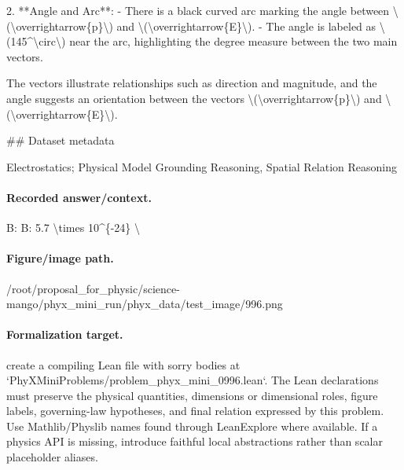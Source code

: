 2. **Angle and Arc**:
   - There is a black curved arc marking the angle between \textbackslash{}(\textbackslash{}overrightarrow\{p\}\textbackslash{}) and \textbackslash{}(\textbackslash{}overrightarrow\{E\}\textbackslash{}).
   - The angle is labeled as \textbackslash{}(145\textasciicircum{}\textbackslash{}circ\textbackslash{}) near the arc, highlighting the degree measure between the two main vectors.

The vectors illustrate relationships such as direction and magnitude, and the angle suggests an orientation between the vectors \textbackslash{}(\textbackslash{}overrightarrow\{p\}\textbackslash{}) and \textbackslash{}(\textbackslash{}overrightarrow\{E\}\textbackslash{}).

\#\# Dataset metadata

Electrostatics; Physical Model Grounding Reasoning, Spatial Relation Reasoning

\paragraph{Recorded answer/context.}
B: B: 5.7 \textbackslash{}times 10\textasciicircum{}\{-24\} \textbackslash{}

\paragraph{Figure/image path.}
/root/proposal\_for\_physic/science-mango/phyx\_mini\_run/phyx\_data/test\_image/996.png

\paragraph{Formalization target.}
create a compiling Lean file with sorry bodies at `PhyXMiniProblems/problem\_phyx\_mini\_0996.lean`. The Lean declarations must preserve the physical quantities, dimensions or dimensional roles, figure labels, governing-law hypotheses, and final relation expressed by this problem.
Use Mathlib/Physlib names found through LeanExplore where available. If a physics API is missing, introduce faithful local abstractions rather than scalar placeholder aliases.


